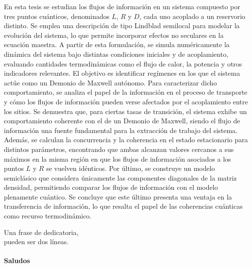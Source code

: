 \documentclass[
	spanish, %
	letterpaper, oneside
]{book}
\begin{document}
\templatePortrait

\templatePagecfg

\begin{abstractd}
En esta tesis se estudian los flujos de información en un sistema compuesto por tres puntos cuánticos, denominados \( L \), \( R \) y \( D \), cada uno acoplado a un reservorio distinto. Se emplea una descripción de tipo Lindblad semilocal para modelar la evolución del sistema, lo que permite incorporar efectos no seculares en la ecuación maestra. A partir de esta formulación, se simula numéricamente la dinámica del sistema bajo distintas condiciones iniciales y de acoplamiento, evaluando cantidades termodinámicas como el flujo de calor, la potencia y otros indicadores relevantes. El objetivo es identificar regímenes en los que el sistema actúe como un Demonio de Maxwell autónomo. Para caracterizar dicho comportamiento, se analiza el papel de la información en el proceso de transporte y cómo los flujos de información pueden verse afectados por el acoplamiento entre los sitios. Se demuestra que, para ciertas tasas de transición, el sistema exhibe un comportamiento coherente con el de un Demonio de Maxwell, siendo el flujo de información una fuente fundamental para la extracción de trabajo del sistema. Además, se calculan la concurrencia y la coherencia en el estado estacionario para distintos parámetros, encontrando que ambas alcanzan valores cercanos a sus máximos en la misma región en que los flujos de información asociados a los puntos \( L \) y \( R \) se vuelven idénticos. Por último, se construye un modelo semiclásico que considera únicamente las componentes diagonales de la matriz densidad, permitiendo comparar los flujos de información con el modelo plenamente cuántico. Se concluye que este último presenta una ventaja en la transferencia de información, lo que resalta el papel de las coherencias cuánticas como recurso termodinámico.
\end{abstractd}


\begin{dedicatory}
	Una frase de dedicatoria, \\
	pueden ser dos líneas. \\
	~ \\
	\textbf{Saludos}
\end{dedicatory}

\begin{acknowledgments}
	\lipsum[1]
\end{acknowledgments}

\templateIndex

\templateFinalcfg



\end{document}

